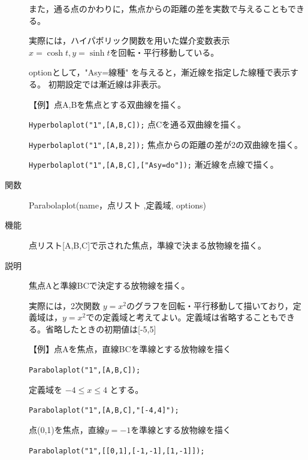 \documentclass[papersize,a4paper,12pt,uplatex]{jsarticle}
\begin{document}
\begin{description}
また，通る点のかわりに，焦点からの距離の差を実数で与えることもできる。

実際には，ハイパボリック関数を用いた媒介変数表示 $x=\cosh t,y=\sinh t$を回転・平行移動している。

optionとして，"Asy=線種"  を与えると，漸近線を指定した線種で表示する。 初期設定では漸近線は非表示。
  
\vspace{\baselineskip}
【例】点A,Bを焦点とする双曲線を描く。

\verb|Hyperbolaplot("1",[A,B,C]);|     点Cを通る双曲線を描く。

\verb|Hyperbolaplot("1",[A,B,2]);|      焦点からの距離の差が2の双曲線を描く。

\verb|Hyperbolaplot("1",[A,B,C],["Asy=do"]);|   漸近線を点線で描く。

\vspace{\baselineskip}
\hspace{20mm} \scalebox{0.9}{}

\vspace{\baselineskip}
\hypertarget{parabolaplot}{}
\item[関数]  Parabolaplot(name，点リスト ,定義域, options)
\item[機能]  点リスト[A,B,C]で示された焦点，準線で決まる放物線を描く。
\item[説明]  焦点Aと準線BCで決定する放物線を描く。

  実際には，2次関数 $y=x^2$のグラフを回転・平行移動して描いており，定義域は，$y=x^2$での定義域と考えてよい。定義域は省略することもできる。省略したときの初期値は[-5,5]

\vspace{\baselineskip}
【例】点Aを焦点，直線BCを準線とする放物線を描く

\hspace{10mm}\verb|Parabolaplot("1",[A,B,C]); |
      
定義域を $-4 \leq x \leq 4$ とする。

\hspace{10mm} \verb|Parabolaplot("1",[A,B,C],"[-4,4]");|

点(0,1)を焦点，直線$y=-1$を準線とする放物線を描く

\hspace{10mm} \verb|Parabolaplot("1",[[0,1],[-1,-1],[1,-1]]);|


\end{description}
\end{document}
